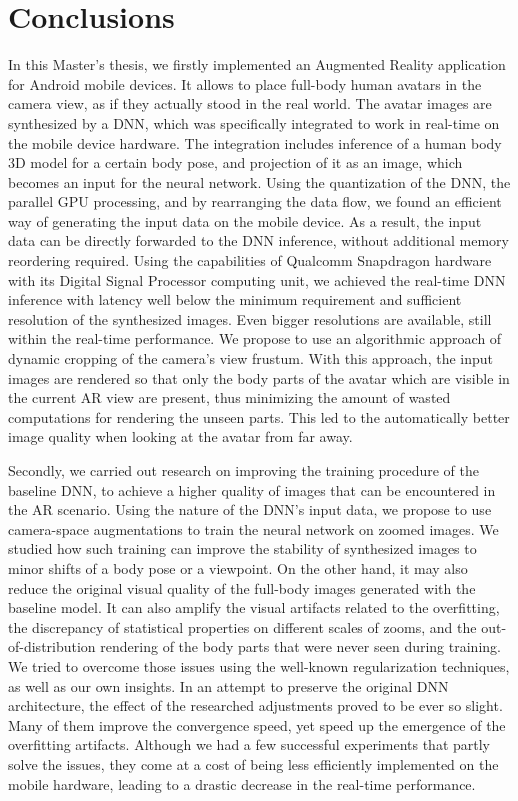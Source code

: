 \chapter{Conclusions}\label{chapter:conclusions}

In this Master's thesis, we firstly implemented an Augmented Reality application for Android mobile devices. It allows to place full-body human avatars in the camera view, as if they actually stood in the real world. The avatar images are synthesized by a DNN, which was specifically integrated to work in real-time on the mobile device hardware. The integration includes inference of a human body 3D model for a certain body pose, and projection of it as an image, which becomes an input for the neural network. Using the quantization of the DNN, the parallel GPU processing, and by rearranging the data flow, we found an efficient way of generating the input data on the mobile device. As a result, the input data can be directly forwarded to the DNN inference, without additional memory reordering required. Using the capabilities of Qualcomm Snapdragon hardware with its Digital Signal Processor computing unit, we achieved the real-time DNN inference with latency well below the minimum requirement and sufficient resolution of the synthesized images. Even bigger resolutions are available, still within the real-time performance. We propose to use an algorithmic approach of dynamic cropping of the camera's view frustum. With this approach, the input images are rendered so that only the body parts of the avatar which are visible in the current AR view are present, thus minimizing the amount of wasted computations for rendering the unseen parts. This led to the automatically better image quality when looking at the avatar from far away.

Secondly, we carried out research on improving the training procedure of the baseline DNN, to achieve a higher quality of images that can be encountered in the AR scenario. Using the nature of the DNN's input data, we propose to use camera-space augmentations to train the neural network on zoomed images. We studied how such training can improve the stability of synthesized images to minor shifts of a body pose or a viewpoint. On the other hand, it may also reduce the original visual quality of the full-body images generated with the baseline model. It can also amplify the visual artifacts related to the overfitting, the discrepancy of statistical properties on different scales of zooms, and the out-of-distribution rendering of the body parts that were never seen during training. We tried to overcome those issues using the well-known regularization techniques, as well as our own insights. In an attempt to preserve the original DNN architecture, the effect of the researched adjustments proved to be ever so slight. Many of them improve the convergence speed, yet speed up the emergence of the overfitting artifacts. Although we had a few successful experiments that partly solve the issues, they come at a cost of being less efficiently implemented on the mobile hardware, leading to a drastic decrease in the real-time performance. 

